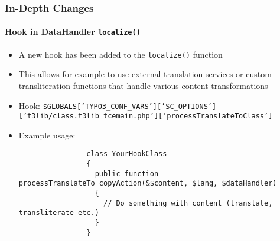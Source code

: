 \begin{frame}[fragile]
	\frametitle{In-Depth Changes}
	\framesubtitle{Hook in DataHandler \texttt{localize()}}

	\lstset{basicstyle=\tiny\ttfamily}

	\begin{itemize}
		\item A new hook has been added to the \texttt{localize()} function
		\item This allows for example to use external translation services or custom transliteration
			functions that handle various content transformations
	\end{itemize}

	\begin{itemize}
		\item Hook:\newline
			\smaller
				\texttt{\$GLOBALS['TYPO3\_CONF\_VARS']['SC\_OPTIONS']\newline
				\tabto{0.4cm}['t3lib/class.t3lib\_tcemain.php']['processTranslateToClass']}
			\normalsize

		\item Example usage:

			\begin{lstlisting}
				class YourHookClass
				{
				  public function processTranslateTo_copyAction(&$content, $lang, $dataHandler)
				  {
				    // Do something with content (translate, transliterate etc.)
				  }
				}
			\end{lstlisting}
	\end{itemize}

\end{frame}









